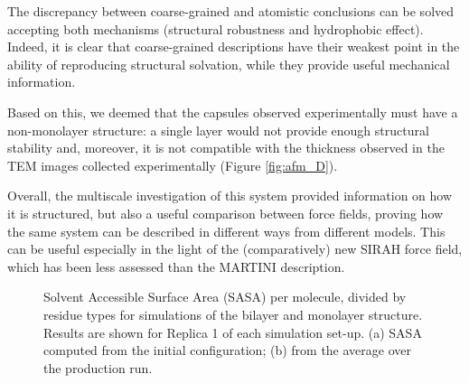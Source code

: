 The discrepancy between coarse-grained and atomistic conclusions can be solved accepting both mechanisms (structural robustness and hydrophobic effect). Indeed, it is clear that coarse-grained descriptions have their weakest point in the ability of reproducing structural solvation, while they provide useful mechanical information.
 
Based on this, we deemed that the capsules observed experimentally must have a non-monolayer structure: a single layer would not provide enough structural stability and, moreover, it is not compatible with the thickness observed in the TEM images collected experimentally (Figure \ref{fig:afm_D}).

Overall, the multiscale investigation of this system provided information on how it is structured, but also a useful comparison between force fields, proving how the same system can be described in different ways from different models. This can be useful especially in the light of the (comparatively) new SIRAH force field, which has been less assessed than the MARTINI description.
%
\begin{figure}[t!]
\centering
{} 
\caption[SASA per residue of monolayer and bilater]{Solvent Accessible Surface Area (SASA) per molecule, divided by residue types for simulations of the bilayer and monolayer structure. Results are shown for Replica 1 of each simulation set-up. (a) SASA computed from the initial configuration; (b) from the average over the production run.}
\label{fig:mono_bi_sasa}
\end{figure}


